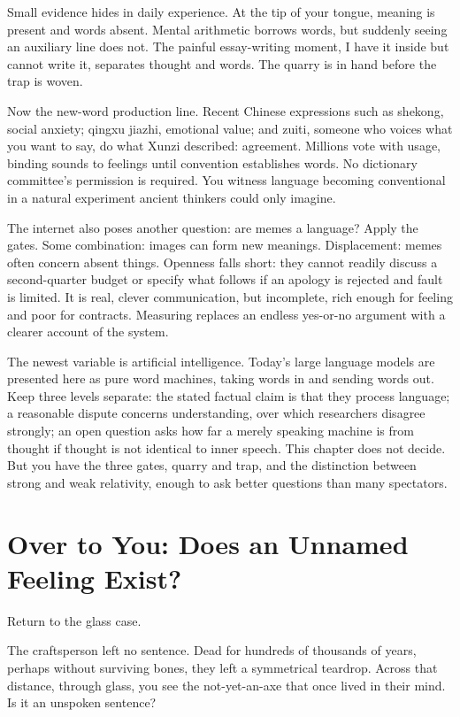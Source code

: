 Small evidence hides in daily experience. At the tip of your tongue, meaning is present and words absent. Mental arithmetic borrows words, but suddenly seeing an auxiliary line does not. The painful essay-writing moment, I have it inside but cannot write it, separates thought and words. The quarry is in hand before the trap is woven.

Now the new-word production line. Recent Chinese expressions such as shekong, social anxiety; qingxu jiazhi, emotional value; and zuiti, someone who voices what you want to say, do what Xunzi described: agreement. Millions vote with usage, binding sounds to feelings until convention establishes words. No dictionary committee's permission is required. You witness language becoming conventional in a natural experiment ancient thinkers could only imagine.

The internet also poses another question: are memes a language? Apply the gates. Some combination: images can form new meanings. Displacement: memes often concern absent things. Openness falls short: they cannot readily discuss a second-quarter budget or specify what follows if an apology is rejected and fault is limited. It is real, clever communication, but incomplete, rich enough for feeling and poor for contracts. Measuring replaces an endless yes-or-no argument with a clearer account of the system.

The newest variable is artificial intelligence. Today's large language models are presented here as pure word machines, taking words in and sending words out. Keep three levels separate: the stated factual claim is that they process language; a reasonable dispute concerns understanding, over which researchers disagree strongly; an open question asks how far a merely speaking machine is from thought if thought is not identical to inner speech. This chapter does not decide. But you have the three gates, quarry and trap, and the distinction between strong and weak relativity, enough to ask better questions than many spectators.

\section{Over to You: Does an Unnamed Feeling Exist?}
Return to the glass case.

The craftsperson left no sentence. Dead for hundreds of thousands of years, perhaps without surviving bones, they left a symmetrical teardrop. Across that distance, through glass, you see the not-yet-an-axe that once lived in their mind. Is it an unspoken sentence?

